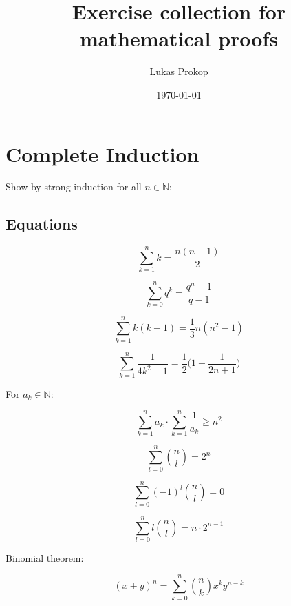 \documentclass[11pt,a4paper,twocolumn]{article}
\title{Exercise collection for mathematical proofs}
\author{Lukas Prokop}
\date{\today}
\theoremstyle{area}
\begin{document}
\maketitle

\section{Complete Induction}

Show by strong induction for all $n \in \mathbb{N}$:

\subsection{Equations}

\begin{equation}
    \sum_{k=1}^n k = \frac{n (n-1)}{2}
\end{equation}

\begin{equation}
    \sum_{k=0}^n q^k = \frac{q^n - 1}{q - 1}
\end{equation}

\begin{equation}
    \sum_{k=1}^n k (k-1) = \frac13 n (n^2 - 1)
\end{equation}

\begin{equation}
    \sum_{k=1}^n \frac{1}{4k^2 - 1} = \frac12 \Big(1 - \frac{1}{2n + 1}\Big)
\end{equation}

For $a_k \in \mathbb{N}$:

\begin{equation}
    \sum_{k=1}^n a_k \cdot \sum_{k=1}^n \frac{1}{a_k} \geq n^2
\end{equation}

\begin{equation}
    \sum_{l=0}^n \binom{n}{l} = 2^n
\end{equation}

\begin{equation}
    \sum_{l=0}^n (-1)^l \binom{n}{l} = 0
\end{equation}

\begin{equation}
    \sum_{l=0}^n l \binom{n}{l} = n\cdot 2^{n-1}
\end{equation}

Binomial theorem:

\begin{equation}
    (x + y)^n = \sum_{k=0}^n \binom{n}{k} x^k y^{n-k}
\end{equation}
\end{document}
